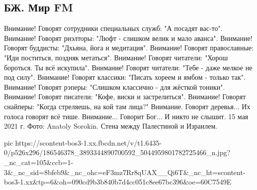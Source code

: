  
 
 
 
 
\subsection{БЖ. Мир FM}
\label{sec:15_05_2021.fb.bilchenko_evgenia.4.govorit_bog_palestina_stena}

Внимание! 
Говорят сотрудники специальных служб: "А посадят вас-то".
Внимание! 
Говорят риэлторы: "Люфт - слишком велик и мало аванса".
Внимание! 
Говорят буддисты: "Дхьяна, йога и медитация".
Внимание!
Говорят православные: "Иди поститься, поздняк метаться".
Внимание! 
Говорят читатели: "Хорош бороться. Ты всё искупила".
Внимание! 
Говорят читатели: "Тебе - даже мелкое не под силу".
Внимание! 
Говорят классики: "Писать хореем и ямбом - только так".
Внимание! 
Говорят рэперы: "Слишком классично - для жёсткой тоники".
Внимание! 
Говорят писатели: "Кофе, виски и застрелиться".
Внимание! 
Говорят снайперы: "Когда стреляешь,  на кой там лица?"
Внимание. 
Говорят деревья...
Их голоса говорят всё тише.
Внимание...
Говорит Бог...
И никто не слышит.
15 мая 2021 г.
Фото: Anatoly Sorokin. Стена между Палестиной и Израилем.


\ifcmt
  pic https://scontent-bos3-1.xx.fbcdn.net/v/t1.6435-0/p526x296/186546378_3893344890700592_5044959801782725466_n.jpg?_nc_cat=105&ccb=1-3&_nc_sid=8bfeb9&_nc_ohc=eF3mz7Rr8qUAX__Qi6T&_nc_ht=scontent-bos3-1.xx&tp=6&oh=090cd9b3b840b7d4cc051c8ee67bc396&oe=60C7549E
\fi


